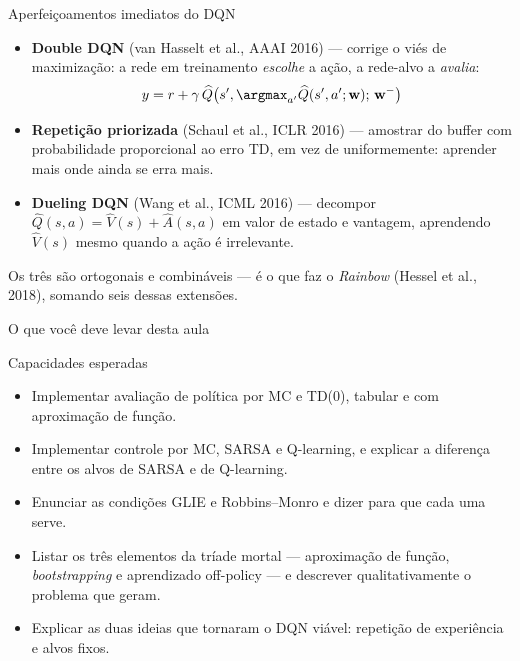 \documentclass[aspectratio=169, 11pt]{beamer}
\newcommand{\Qhat}{\widehat{Q}}
\newcommand{\Vhat}{\widehat{V}}
\newcommand{\wv}{\mathbf{w}}
\newcommand{\wtar}{\mathbf{w}^{-}}
\begin{document}
\begin{frame}{Aperfeiçoamentos imediatos do DQN}

  \begin{itemize}\setlength{\itemsep}{0.5ex}
    \item \textbf{Double DQN} (van Hasselt et al., AAAI 2016) --- corrige o
      viés de maximização: a rede em treinamento \emph{escolhe} a ação,
      a rede-alvo a \emph{avalia}:
      \[ y = r + \gamma\, \Qhat\bigl(s', \argmax_{a'} \Qhat(s',a';\wv);\, \wtar\bigr) \]
    \item \textbf{Repetição priorizada} (Schaul et al., ICLR 2016) ---
      amostrar do buffer com probabilidade proporcional ao erro TD, em vez
      de uniformemente: aprender mais onde ainda se erra mais.
    \item \textbf{Dueling DQN} (Wang et al., ICML 2016) --- decompor
      $\Qhat(s,a) = \Vhat(s) + \widehat{A}(s,a)$ em valor de estado e
      vantagem, aprendendo $\Vhat(s)$ mesmo quando a ação é irrelevante.
  \end{itemize}

  \begin{ideiabox}
    Os três são ortogonais e combináveis --- é o que faz o \emph{Rainbow}
    (Hessel et al., 2018), somando seis dessas extensões.
  \end{ideiabox}
\end{frame}

\begin{frame}{O que você deve levar desta aula}

  \begin{defbox}{Capacidades esperadas}
    \begin{itemize}\setlength{\itemsep}{0.3ex}
      \item Implementar avaliação de política por MC e TD(0), tabular e com
        aproximação de função.
      \item Implementar controle por MC, SARSA e Q-learning, e explicar a
        diferença entre os alvos de SARSA e de Q-learning.
      \item Enunciar as condições GLIE e Robbins--Monro e dizer para que
        cada uma serve.
      \item Listar os três elementos da tríade mortal --- aproximação de
        função, \emph{bootstrapping} e aprendizado off-policy --- e
        descrever qualitativamente o problema que geram.
      \item Explicar as duas ideias que tornaram o DQN viável: repetição de
        experiência e alvos fixos.
    \end{itemize}
  \end{defbox}

\end{frame}
\end{document}
